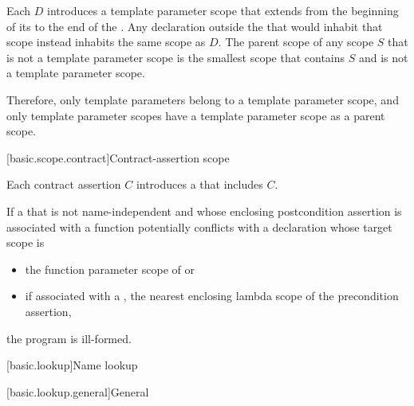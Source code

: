 \pnum
Each  $D$ introduces
a template parameter scope
that extends from the beginning of its 
to the end of the .
Any declaration outside the 
that would inhabit that scope instead inhabits the same scope as $D$.
The parent scope of any scope $S$ that is not a template parameter scope
is the smallest scope that contains $S$ and is not a template parameter scope.
\begin{note}
Therefore, only template parameters belong to a template parameter scope, and
only template parameter scopes have
a template parameter scope as a parent scope.
\end{note}

[basic.scope.contract]{Contract-assertion scope}%

\pnum
Each contract assertion
$C$ introduces a 
that includes $C$.

\pnum
If a 
that is not name-independent
and whose enclosing postcondition assertion
is associated with a function 
potentially conflicts with
a declaration whose target scope is
\begin{itemize}
\item
the function parameter scope of  or
\item
if associated with a ,
the nearest enclosing lambda scope
of the precondition assertion,
\end{itemize}
the program is ill-formed.


[basic.lookup]{Name lookup}%


[basic.lookup.general]{General}%
%

